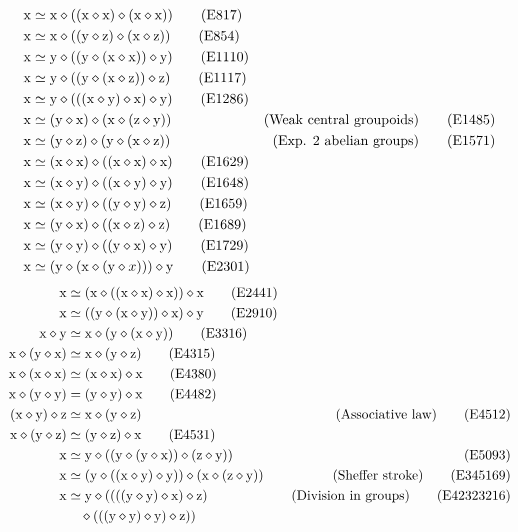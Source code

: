 \begin{align}
    \x &\formaleq \x \op ((\x \op \x) \op (\x \op \x)) \label{eq817}\tag{E817} \\
    \x &\formaleq \x \op ((\y \op \z) \op (\x \op \z)) \label{eq854}\tag{E854}\\
    \x &\formaleq \y \op ((\y \op (\x \op \x)) \op \y) \label{eq1110}\tag{E1110} \\
    \x &\formaleq \y \op ((\y \op (\x \op \z)) \op \z) \label{eq1117}\tag{E1117} \\
    \x &\formaleq \y \op (((\x \op \y) \op \x) \op \y) \label{eq1286}\tag{E1286} \\
    \x &\formaleq (\y \op \x) \op (\x \op (\z \op \y)) & \hbox{(Weak central groupoids)}\label{eq1485}\tag{E1485} \\
    \x &\formaleq (\y \op \z) \op (\y \op (\x \op \z)) & \hbox{(Exp. $2$ abelian groups)} \label{eq1571}\tag{E1571} \\
    \x &\formaleq (\x \op \x) \op ((\x \op \x) \op \x) \label{eq1629}\tag{E1629} \\
    \x &\formaleq (\x \op \y) \op ((\x \op \y) \op \y) \label{eq1648}\tag{E1648} \\
    \x &\formaleq (\x \op \y) \op ((\y \op \y) \op \z) \label{eq1659}\tag{E1659} \\
    \x &\formaleq (\y \op \x) \op ((\x \op \z) \op \z) \label{eq1689}\tag{E1689} \\
    \x &\formaleq (\y \op \y) \op ((\y \op \x) \op \y) \label{eq1729}\tag{E1729} \\
    \x &\formaleq (\y \op (\x \op (\y \op x))) \op \y \label{eq2301}\tag{E2301}
\end{align}
    \begin{align}
        \x &\formaleq (\x \op ((\x \op \x) \op \x)) \op \x \label{eq2441}\tag{E2441} \\
        \x &\formaleq ((\y \op (\x \op \y)) \op \x) \op \y \label{eq2910}\tag{E2910} \\
        \x \op \y &\formaleq \x \op (\y \op (\x \op \y)) \label{eq3316}\tag{E3316} \\
        \x \op (\y \op \x) &\formaleq \x \op (\y \op \z) \label{eq4315}\tag{E4315} \\
        \x \op (\x \op \x) &\formaleq (\x \op \x) \op \x \label{eq4380}\tag{E4380} \\
        \x \op (\y \op \y) &= (\y \op \y) \op \x \label{eq4482}\tag{E4482} \\
        (\x \op \y) \op \z &\formaleq \x \op (\y \op \z) &\hbox{(Associative law)} \label{eq4512}\tag{E4512}\\
        \x \op (\y \op \z) &\formaleq (\y \op \z) \op \x \label{eq4531}\tag{E4531} \\
        \x &\formaleq \y \op ((\y \op (\y \op \x)) \op (\z \op \y)) &  \label{eq5093}\tag{E5093} \\
        \x &\formaleq (\y \op ((\x \op \y) \op \y)) \op (\x \op (\z \op \y)) & \hbox{(Sheffer stroke)} \label{eq345169}\tag{E345169} \\
        \x &\formaleq \y \op ((((\y \op \y) \op \x) \op \z) & \hbox{(Division in groups)} \label{eq42323216}\tag{E42323216} \\
        & \quad  \op (((\y \op \y) \op \y) \op \z)) \nonumber
\end{align}
